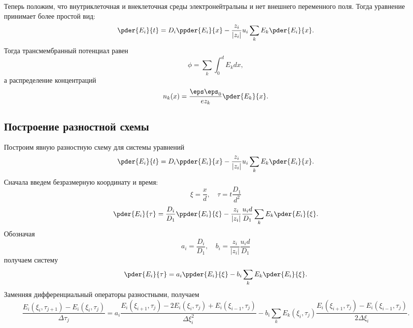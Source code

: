 \documentclass{hedwork}
\begin{document}
    Теперь положим, что внутриклеточная и внеклеточная среды электронейтральны и
    нет внешнего переменного поля. Тогда уравнение принимает более простой вид:
    \begin{equation}
        \pder{E_i}{t} = D_i\ppder{E_i}{x} -
        \frac{z_i}{|z_i|}u_i \sum_{k} E_k \pder{E_i}{x}.
    \end{equation}
    Тогда трансмембранный потенциал равен
    \begin{equation}
        \phi = \sum_k \int_0^d E_k dx,
    \end{equation}
    а распределение концентраций
    \begin{equation}
        n_k(x) = \frac{\eps\eps_0}{ez_k}\pder{E_k}{x}.
    \end{equation}
\subsection{Построение разностной схемы}
    Построим явную разностную схему для системы уравнений
    \begin{equation}
        \pder{E_i}{t} = D_i\ppder{E_i}{x} -
        \frac{z_i}{|z_i|}u_i \sum_{k} E_k \pder{E_i}{x}.
    \end{equation}
    Сначала введем безразмерную координату и время:
    \begin{equation}
        \xi = \frac{x}{d},\quad \tau = t\frac{D_1}{d^2}
    \end{equation}
    \begin{equation}
        \pder{E_i}{\tau} = \frac{D_i}{D_1}\ppder{E_i}{\xi} -
        \frac{z_i}{|z_i|}\frac{u_id}{D_1} \sum_{k} E_k \pder{E_i}{\xi}.
    \end{equation}
    Обозначая
    \begin{equation}
        a_i = \frac{D_i}{D_1},\quad b_i = \frac{z_i}{|z_i|}\frac{u_id}{D_1}
    \end{equation}
    получаем систему
    \begin{equation}
        \pder{E_i}{\tau} = a_i\ppder{E_i}{\xi} - b_i\sum_k E_k \pder{E_i}{\xi}.
    \end{equation}
    Заменняя дифференциальный операторы разностными, получаем
    \begin{equation}
        \frac{E_i(\xi_i, \tau_{j+1}) - E_i(\xi_i, \tau_j)}{\Delta\tau_j} =
        a_i\frac{E_i(\xi_{i+1}, \tau_j) - 2E_i(\xi_i, \tau_j) +
        E_i(\xi_{i-1}, \tau_j)}{\Delta\xi_i^2} -
        b_i\sum_k E_k(\xi_i, \tau_j)
        \frac{E_i(\xi_{i+1}, \tau_j) - E_i(\xi_{i-1}, \tau_j)}{2\Delta\xi_i}.
    \end{equation}
\end{document}
